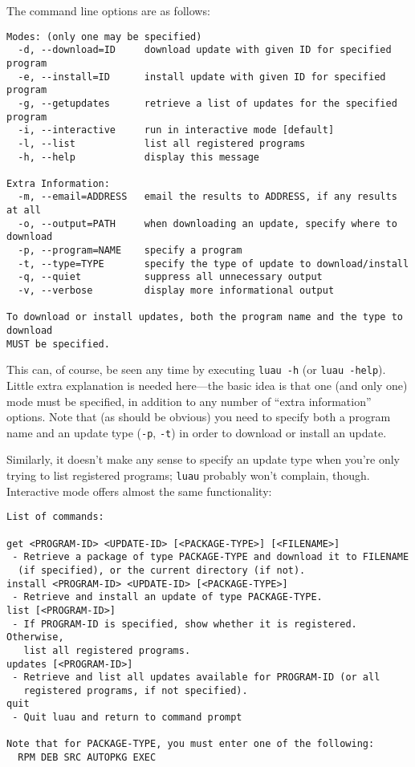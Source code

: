 \documentclass{report}
\begin{document}
The command line options are as follows:
{\footnotesize
\begin{verbatim}
Modes: (only one may be specified)
  -d, --download=ID     download update with given ID for specified program
  -e, --install=ID      install update with given ID for specified program
  -g, --getupdates      retrieve a list of updates for the specified program
  -i, --interactive     run in interactive mode [default]
  -l, --list            list all registered programs
  -h, --help            display this message

Extra Information:
  -m, --email=ADDRESS   email the results to ADDRESS, if any results at all
  -o, --output=PATH     when downloading an update, specify where to download
  -p, --program=NAME    specify a program
  -t, --type=TYPE       specify the type of update to download/install
  -q, --quiet           suppress all unnecessary output
  -v, --verbose         display more informational output

To download or install updates, both the program name and the type to download
MUST be specified.
\end{verbatim}
}
This can, of course, be seen any time by executing \verb+luau -h+ (or \verb+luau -help+).  Little extra explanation is needed here---the basic idea is that one (and only one) mode must be specified, in addition to any number of ``extra information'' options.  Note that (as should be obvious) you need to specify both a program name and an update type (\verb+-p+, \verb+-t+) in order to download or install an update.

Similarly, it doesn't make any sense to specify an update type when you're only trying to list registered programs; \verb+luau+ probably won't complain, though.  Interactive mode offers almost the same functionality:

{\footnotesize
\begin{verbatim}
List of commands:

get <PROGRAM-ID> <UPDATE-ID> [<PACKAGE-TYPE>] [<FILENAME>]
 - Retrieve a package of type PACKAGE-TYPE and download it to FILENAME 
  (if specified), or the current directory (if not).
install <PROGRAM-ID> <UPDATE-ID> [<PACKAGE-TYPE>]
 - Retrieve and install an update of type PACKAGE-TYPE.
list [<PROGRAM-ID>]
 - If PROGRAM-ID is specified, show whether it is registered.  Otherwise,
   list all registered programs.
updates [<PROGRAM-ID>]
 - Retrieve and list all updates available for PROGRAM-ID (or all
   registered programs, if not specified).
quit
 - Quit luau and return to command prompt

Note that for PACKAGE-TYPE, you must enter one of the following:
  RPM DEB SRC AUTOPKG EXEC
\end{verbatim}
}
\end{document}
